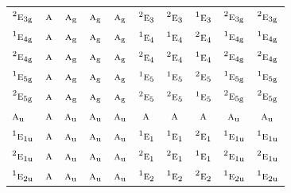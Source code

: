 \documentclass[10pt,a4paper]{article}
\numberwithin{equation}{section}
\newcommand{\irr}[1]{\text{\normalfont\scshape #1}}
\newcommand{\conjpair}[1]{{}^{#1}}
\newcommand{\ptag}[1]{\mathrm{#1}}
\begin{document}
{\begin{longtable}{@{}lccccccccc@{}}
$\conjpair{2}\irr{e}_{3\ptag{g}}$ & $\irr{a}$ & $\irr{a}_{\ptag{g}}$ & $\irr{a}_{\ptag{g}}$ & $\irr{a}_{\ptag{g}}$ & $\conjpair{2}\irr{e}_{3}$ & $\conjpair{2}\irr{e}_{3}$ & $\conjpair{1}\irr{e}_{3}$ & $\conjpair{2}\irr{e}_{3\ptag{g}}$ & $\conjpair{2}\irr{e}_{3\ptag{g}}$\\
$\conjpair{1}\irr{e}_{4\ptag{g}}$ & $\irr{a}$ & $\irr{a}_{\ptag{g}}$ & $\irr{a}_{\ptag{g}}$ & $\irr{a}_{\ptag{g}}$ & $\conjpair{1}\irr{e}_{4}$ & $\conjpair{1}\irr{e}_{4}$ & $\conjpair{2}\irr{e}_{4}$ & $\conjpair{1}\irr{e}_{4\ptag{g}}$ & $\conjpair{1}\irr{e}_{4\ptag{g}}$\\
$\conjpair{2}\irr{e}_{4\ptag{g}}$ & $\irr{a}$ & $\irr{a}_{\ptag{g}}$ & $\irr{a}_{\ptag{g}}$ & $\irr{a}_{\ptag{g}}$ & $\conjpair{2}\irr{e}_{4}$ & $\conjpair{2}\irr{e}_{4}$ & $\conjpair{1}\irr{e}_{4}$ & $\conjpair{2}\irr{e}_{4\ptag{g}}$ & $\conjpair{2}\irr{e}_{4\ptag{g}}$\\
$\conjpair{1}\irr{e}_{5\ptag{g}}$ & $\irr{a}$ & $\irr{a}_{\ptag{g}}$ & $\irr{a}_{\ptag{g}}$ & $\irr{a}_{\ptag{g}}$ & $\conjpair{1}\irr{e}_{5}$ & $\conjpair{1}\irr{e}_{5}$ & $\conjpair{2}\irr{e}_{5}$ & $\conjpair{1}\irr{e}_{5\ptag{g}}$ & $\conjpair{1}\irr{e}_{5\ptag{g}}$\\
$\conjpair{2}\irr{e}_{5\ptag{g}}$ & $\irr{a}$ & $\irr{a}_{\ptag{g}}$ & $\irr{a}_{\ptag{g}}$ & $\irr{a}_{\ptag{g}}$ & $\conjpair{2}\irr{e}_{5}$ & $\conjpair{2}\irr{e}_{5}$ & $\conjpair{1}\irr{e}_{5}$ & $\conjpair{2}\irr{e}_{5\ptag{g}}$ & $\conjpair{2}\irr{e}_{5\ptag{g}}$\\
$\irr{a}_{\ptag{u}}$ & $\irr{a}$ & $\irr{a}_{\ptag{u}}$ & $\irr{a}_{\ptag{u}}$ & $\irr{a}_{\ptag{u}}$ & $\irr{a}$ & $\irr{a}$ & $\irr{a}$ & $\irr{a}_{\ptag{u}}$ & $\irr{a}_{\ptag{u}}$\\
$\conjpair{1}\irr{e}_{1\ptag{u}}$ & $\irr{a}$ & $\irr{a}_{\ptag{u}}$ & $\irr{a}_{\ptag{u}}$ & $\irr{a}_{\ptag{u}}$ & $\conjpair{1}\irr{e}_{1}$ & $\conjpair{1}\irr{e}_{1}$ & $\conjpair{2}\irr{e}_{1}$ & $\conjpair{1}\irr{e}_{1\ptag{u}}$ & $\conjpair{1}\irr{e}_{1\ptag{u}}$\\
$\conjpair{2}\irr{e}_{1\ptag{u}}$ & $\irr{a}$ & $\irr{a}_{\ptag{u}}$ & $\irr{a}_{\ptag{u}}$ & $\irr{a}_{\ptag{u}}$ & $\conjpair{2}\irr{e}_{1}$ & $\conjpair{2}\irr{e}_{1}$ & $\conjpair{1}\irr{e}_{1}$ & $\conjpair{2}\irr{e}_{1\ptag{u}}$ & $\conjpair{2}\irr{e}_{1\ptag{u}}$\\
$\conjpair{1}\irr{e}_{2\ptag{u}}$ & $\irr{a}$ & $\irr{a}_{\ptag{u}}$ & $\irr{a}_{\ptag{u}}$ & $\irr{a}_{\ptag{u}}$ & $\conjpair{1}\irr{e}_{2}$ & $\conjpair{1}\irr{e}_{2}$ & $\conjpair{2}\irr{e}_{2}$ & $\conjpair{1}\irr{e}_{2\ptag{u}}$ & $\conjpair{1}\irr{e}_{2\ptag{u}}$\\

\end{longtable}}
\end{document}
